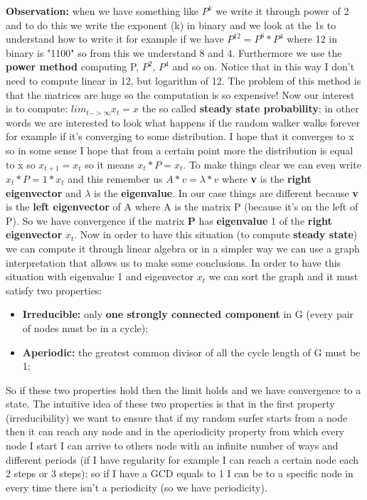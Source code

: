 \textbf{Observation:} when we have something like $P^k$ we write it through power of 2 and to do this we write the exponent (k) in binary and we look at the 1s to understand how to write it for example if we have $P^{12}=P^8*P^4$ where 12 in binary is "1100" so from this we understand 8 and 4. Furthermore we use the \textbf{power method} computing P, $P^2$, $P^4$ and so on. Notice that in this way I don't need to compute linear in 12, but logarithm of 12.\newline
The problem of this method is that the matrices are huge so the computation is so expensive!\newline
Now our interest is to compute: $lim_{t->\infty}x_t=x$ the so called \textbf{steady state probability}; in other words we are interested to look what happens if the random walker walks forever for example if it's converging to some distribution. I hope that it converges to x so in some sense I hope that from a certain point more the distribution is equal to x so $x_{t+1}=x_t$ so it means $x_t*P=x_t$. To make things clear we can even write $x_t*P=1*x_t$ and this remember us $A*v=\lambda*v$ where \textbf{v} is the \textbf{right eigenvector} and $\lambda$ is the \textbf{eigenvalue}.\newline
In our case things are different because \textbf{v} is the \textbf{left eigenvector} of A where A is the matrix P (because it's on the left of P).\newline
So we have convergence if the matrix \textbf{P} has \textbf{eigenvalue} 1 of the \textbf{right eigenvector} $x_t$.\newline
Now in order to have this situation (to compute \textbf{steady state}) we can compute it through linear algebra or in a simpler way we can use a graph interpretation that allows us to make some conclusions. In order to have this situation with eigenvalue 1 and eigenvector $x_t$ we can sort the graph and it must satisfy two properties:
\begin{itemize}
    \item \textbf{Irreducible:} only \textbf{one strongly connected component} in G (every pair of nodes must be in a cycle);
    \item \textbf{Aperiodic:} the greatest common divisor of all the cycle length of G must be 1;
\end{itemize}
So if these two properties hold then the limit holds and we have convergence to a state.\newline
The intuitive idea of these two properties is that in the first property (irreducibility) we want to ensure that if my random surfer starts from a node then it can reach any node and in the aperiodicity property from which every node I start I can arrive to others node with an infinite number of ways and different periods (if I have regularity for example I can reach a certain node each 2 steps or 3 steps); so if I have a GCD equals to 1 I can be to a specific node in every time there isn't a periodicity (so we have periodicity).\newline
